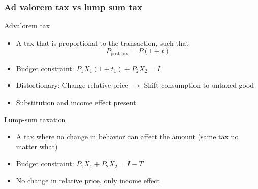 \documentclass[aspectratio=169]{beamer}
\begin{document}
\begin{frame}
\frametitle{Ad valorem tax vs lump sum tax}
Advalorem tax
\begin{itemize}\setlength\itemsep{3pt}
\item A tax that is proportional to the transaction, such that 
\[
P_{\text{post-tax}}=P(1+t)
\]
\item Budget constraint: $P_{1}X_1(1+t_1)+P_2X_2 = I$
\item Distortionary: Change relative price $\to$ Shift consumption to untaxed good
\item Substitution and income effect present
\end{itemize} \medskip


Lump-sum taxation
\begin{itemize}\setlength\itemsep{3pt}
\item A tax where no change in behavior can affect the amount (same tax no matter what)
\item Budget constraint: $P_{1}X_1+P_2X_2 = I-T$
\item No change in relative price, only income effect 
\end{itemize} \medskip
\end{frame}
\end{document}
